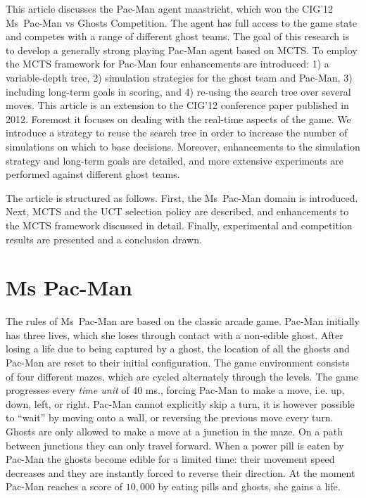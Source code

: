 \documentclass[journal]{IEEEtran}
\begin{document}
 This article discusses the Pac-Man agent {\sc maastricht}, which won the CIG'12 Ms~Pac-Man vs Ghosts Competition. The agent has full access to the game state and competes with a range of different ghost teams. The goal of this research is to develop a generally strong playing Pac-Man agent based on MCTS. To employ the MCTS framework for Pac-Man four enhancements are introduced: 1) a variable-depth tree, 2) simulation strategies for the ghost team and Pac-Man, 3) including long-term goals in scoring, and 4) re-using the search tree over several moves.
This article is an extension to the CIG'12 conference paper \cite{enhancementspacmancig12} published in 2012. Foremost it focuses on dealing with the real-time aspects of the game. We introduce a strategy to reuse the search tree in order to increase the number of simulations on which to base decisions. Moreover, enhancements to the simulation strategy and long-term goals are detailed, and more extensive experiments are performed against different ghost teams.

The article is structured as follows. First, the Ms~Pac-Man domain is introduced. Next, MCTS and the UCT selection policy are described, and enhancements to the MCTS framework discussed in detail. Finally, experimental and competition results are presented and a conclusion drawn.

\section{Ms Pac-Man}
\label{rules}
The rules of Ms~Pac-Man are based on the classic arcade game. Pac-Man initially has three lives, which she loses through contact with a non-edible ghost. After losing a life due to being captured by a ghost, the location of all the ghosts and Pac-Man are reset to their initial configuration. The game environment consists of four different mazes, which are cycled alternately through the levels. The game progresses every \emph{time unit} of 40 ms., forcing Pac-Man to make a move, i.e. up, down, left, or right. Pac-Man cannot explicitly skip a turn, it is however possible to ``wait'' by moving onto a wall, or reversing the previous move every turn. Ghosts are only allowed to make a move at a junction in the maze. On a path between junctions they can only travel forward. When a power pill is eaten by Pac-Man the ghosts become edible for a limited time: their movement speed decreases and they are instantly forced to reverse their direction. At the moment Pac-Man reaches a score of $10,000$ by eating pills and ghosts, she gains a life. 
\end{document}
